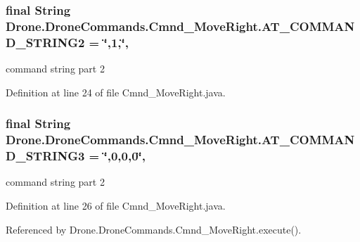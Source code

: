 \subsubsection[{A\+T\+\_\+\+C\+O\+M\+M\+A\+N\+D\+\_\+\+S\+T\+R\+I\+N\+G2}]{\setlength{\rightskip}{0pt plus 5cm}final String Drone.\+Drone\+Commands.\+Cmnd\+\_\+\+Move\+Right.\+A\+T\+\_\+\+C\+O\+M\+M\+A\+N\+D\+\_\+\+S\+T\+R\+I\+N\+G2 = \char`\"{},1,\char`\"{}\hspace{0.3cm}{\ttfamily [static]}, {\ttfamily [private]}}\label{class_drone_1_1_drone_commands_1_1_cmnd___move_right_acf6654e93e4894b2651bf054a6ad0621}
command string part 2 

Definition at line 24 of file Cmnd\+\_\+\+Move\+Right.\+java.

\hypertarget{class_drone_1_1_drone_commands_1_1_cmnd___move_right_a45d9d1ca0c527f3d1fd275e6d5c9457e}{}
\subsubsection[{A\+T\+\_\+\+C\+O\+M\+M\+A\+N\+D\+\_\+\+S\+T\+R\+I\+N\+G3}]{\setlength{\rightskip}{0pt plus 5cm}final String Drone.\+Drone\+Commands.\+Cmnd\+\_\+\+Move\+Right.\+A\+T\+\_\+\+C\+O\+M\+M\+A\+N\+D\+\_\+\+S\+T\+R\+I\+N\+G3 = \char`\"{},0,0,0\char`\"{}\hspace{0.3cm}{\ttfamily [static]}, {\ttfamily [private]}}\label{class_drone_1_1_drone_commands_1_1_cmnd___move_right_a45d9d1ca0c527f3d1fd275e6d5c9457e}
command string part 2 

Definition at line 26 of file Cmnd\+\_\+\+Move\+Right.\+java.



Referenced by Drone.\+Drone\+Commands.\+Cmnd\+\_\+\+Move\+Right.\+execute().

\hypertarget{class_drone_1_1_drone_commands_1_1_cmnd___move_right_aca0fa5bb4d8bf88a06b0b719c926cc11}{}
